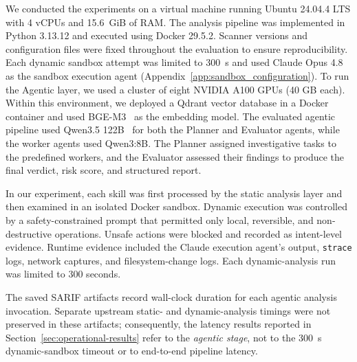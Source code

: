 \label{sec:experiment_setup}




We conducted the experiments on a virtual machine running Ubuntu 24.04.4 LTS with 4 vCPUs and 15.6~GiB of RAM. The analysis pipeline was implemented in Python 3.13.12 and executed using Docker 29.5.2. Scanner versions and configuration files were fixed throughout the evaluation to ensure reproducibility. Each dynamic sandbox attempt was limited to 300~s and used Claude Opus 4.8 as the sandbox execution agent (Appendix~\ref{app:sandbox_configuration}). To run the Agentic layer, we used a cluster of eight NVIDIA A100 GPUs (40 GB each). Within this environment, we deployed a Qdrant vector database in a Docker container and used BGE-M3~\cite{bge-m3} as the embedding model. The evaluated agentic pipeline used
Qwen3.5 122B~\cite{qwen35_122} for both the Planner
and Evaluator agents, while the worker agents used Qwen3:8B. The Planner assigned investigative
tasks to the predefined workers, and the Evaluator
assessed their findings to produce the final verdict,
risk score, and structured report.

In our experiment, each skill was first processed by the static analysis layer and then examined in an isolated Docker sandbox. Dynamic execution was controlled by a safety-constrained prompt that permitted only local, reversible, and non-destructive operations. Unsafe actions were blocked and recorded as intent-level evidence. Runtime evidence included the Claude execution agent's output, \texttt{strace} logs, network captures, and filesystem-change logs. Each dynamic-analysis run was limited to 300 seconds.

The saved SARIF artifacts record wall-clock duration for each agentic analysis invocation. Separate upstream static- and dynamic-analysis timings were not preserved in these artifacts; consequently, the latency results reported in Section~\ref{sec:operational-results} refer to the \emph{agentic stage}, not to the 300~s dynamic-sandbox timeout or to end-to-end pipeline latency.





